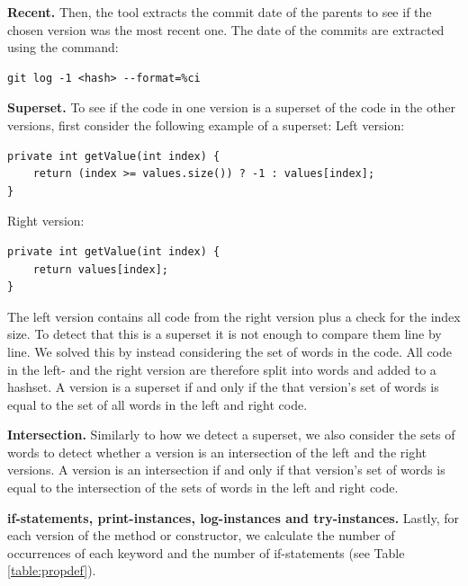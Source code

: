 \textbf{Recent.} Then, the tool extracts the commit date of the parents to see if the chosen version was the most recent one. The date of the commits are extracted using the command:
\lstset{language=Bash,numbers=left,xleftmargin=2em,frame=single,framexleftmargin=1.5em}
\begin{lstlisting}[frame=single,breaklines=true,tabsize=2]
git log -1 <hash> --format=%ci
\end{lstlisting}

\textbf{Superset.} To see if the code in one version is a superset of the code in the other versions, first consider the following example of a superset:
Left version:
\lstset{language=Java,numbers=left,xleftmargin=2em,frame=single,framexleftmargin=1.5em}
\begin{lstlisting}[frame=single,breaklines=true,tabsize=2]
private int getValue(int index) {
	return (index >= values.size()) ? -1 : values[index];
}
\end{lstlisting}

Right version:
\lstset{language=Java,numbers=left,xleftmargin=2em,frame=single,framexleftmargin=1.5em}
\begin{lstlisting}[frame=single,breaklines=true,tabsize=2]
private int getValue(int index) {
	return values[index];
}
\end{lstlisting}
The left version contains all code from the right version plus a check for the index size. To detect that this is a superset it is not enough to compare them line by line. We solved this by instead considering the set of words in the code. All code in the left- and the right version are therefore split into words and added to a hashset. A version is a superset if and only if the  that version’s set of words is equal to the set of all words in the left and right code.

\textbf{Intersection.} Similarly to how we detect a superset, we also consider the sets of words to detect whether a version is an intersection of the left and the right versions. A version is an intersection if and only if that version’s set of words is equal to the intersection of the sets of words in the left and right code.

\textbf{if-statements, print-instances, log-instances and try-instances.} Lastly, for each version of the method or constructor, we calculate the number of occurrences of each keyword and the number of if-statements (see Table \ref{table:propdef}).




